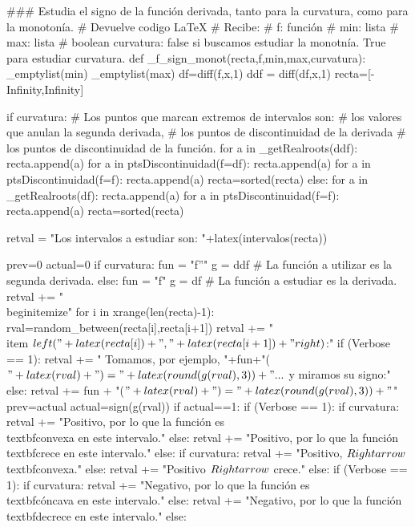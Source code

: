 \begin{sagesilent}
### Estudia el signo de la función derivada, tanto para la curvatura, como para la monotonía.
# Devuelve codigo LaTeX
# Recibe:
# f: función
# min: lista
# max: lista
# boolean curvatura: false si buscamos estudiar la monotnía. True para estudiar curvatura.
def _f_sign_monot(recta,f,min,max,curvatura):
 _emptylist(min)
 _emptylist(max)
 df=diff(f,x,1)
 ddf = diff(df,x,1)
 recta=[-Infinity,Infinity]
 
 if curvatura:
    # Los puntos que marcan extremos de intervalos son:
    #       los valores que anulan la segunda derivada, 
    #       los puntos de discontinuidad de la derivada 
    #       los puntos de discontinuidad de la función.
    for a in _getRealroots(ddf):
        recta.append(a)
    for a in ptsDiscontinuidad(f=df):
        recta.append(a)
    for a in ptsDiscontinuidad(f=f):
        recta.append(a)
    recta=sorted(recta) 
 else:
    for a in _getRealroots(df):
        recta.append(a)
    for a in ptsDiscontinuidad(f=f):
        recta.append(a)
    recta=sorted(recta) 
 
 retval = "Los intervalos a estudiar son: "+latex(intervalos(recta))
 
 prev=0
 actual=0
 if curvatura:
    fun = "f''"
    g = ddf # La función a utilizar es la segunda derivada.
 else:
    fun = "f"
    g = df # La función a estudiar es la derivada.
 retval += "\\begin{itemize}"
 for i in xrange(len(recta)-1):
  rval=random_between(recta[i],recta[i+1])
  retval += "\\item $\\left("+latex(recta[i])+","+latex(recta[i+1])+"\\right)$:"
  if (Verbose == 1):
   retval += " Tomamos, por ejemplo, "+fun+"($"+latex(rval)+") = "+latex(round(g(rval),3))+"...$  y miramos su signo:" 
  else:
   retval += fun + "($"+latex(rval)+") = "+latex(round(g(rval),3)) +"$"
  prev=actual
  actual=sign(g(rval))
  if actual==1: 
   if (Verbose == 1):
    if curvatura:
        retval += "Positivo, por lo que la función es \\textbf{convexa} en este intervalo."
    else:
        retval += "Positivo, por lo que la función \\textbf{crece} en este intervalo."  
   else:
    if curvatura:
        retval += "Positivo, $\\Rightarrow$ \\textbf{convexa}."
    else:  
        retval += "Positivo $\\Rightarrow$ crece."
  else:
   if (Verbose == 1):
    if curvatura:
        retval += "Negativo, por lo que la función es \\textbf{cóncava} en este intervalo."
    else:
        retval += "Negativo, por lo que la función \\textbf{decrece} en este intervalo."
   else:


\end{sagesilent}
